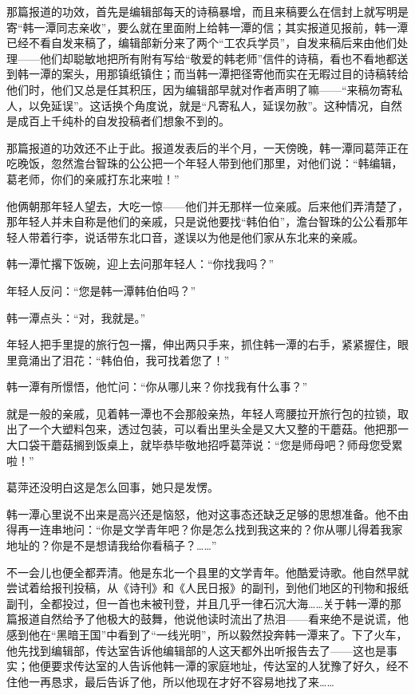 \par 那篇报道的功效，首先是编辑部每天的诗稿暴增，而且来稿要么在信封上就写明是寄“韩一潭同志亲收”，要么就在里面附上给韩一潭的信；其实报道见报前，韩一潭已经不看自发来稿了，编辑部新分来了两个“工农兵学员”，自发来稿后来由他们处理——他们却聪敏地把所有附有写给“敬爱的韩老师”信件的诗稿，看也不看地都送到韩一潭的案头，用那镇纸镇住；而当韩一潭把径寄他而实在无暇过目的诗稿转给他们时，他们又总是任其积压，因为编辑部早就对作者声明了嘛——“来稿勿寄私人，以免延误”。这话换个角度说，就是“凡寄私人，延误勿赦”。这种情况，自然是成百上千纯朴的自发投稿者们想象不到的。
\par 那篇报道的功效还不止于此。报道发表后的半个月，一天傍晚，韩一潭同葛萍正在吃晚饭，忽然澹台智珠的公公把一个年轻人带到他们那里，对他们说：“韩编辑，葛老师，你们的亲戚打东北来啦！”
\par 他俩朝那年轻人望去，大吃一惊——他们并无那样一位亲戚。后来他们弄清楚了，那年轻人并未自称是他们的亲戚，只是说他要找“韩伯伯”，澹台智珠的公公看那年轻人带着行李，说话带东北口音，遂误以为他是他们家从东北来的亲戚。
\par 韩一潭忙撂下饭碗，迎上去问那年轻人：“你找我吗？”
\par 年轻人反问：“您是韩一潭韩伯伯吗？”
\par 韩一潭点头：“对，我就是。”
\par 年轻人把手里提的旅行包一撂，伸出两只手来，抓住韩一潭的右手，紧紧握住，眼里竟涌出了泪花：“韩伯伯，我可找着您了！”
\par 韩一潭有所憬悟，他忙问：“你从哪儿来？你找我有什么事？”
\par 就是一般的亲戚，见着韩一潭也不会那般亲热，年轻人弯腰拉开旅行包的拉锁，取出了一个大塑料包来，透过包装，可以看出里头全是又大又整的干蘑菇。他把那一大口袋干蘑菇搁到饭桌上，就毕恭毕敬地招呼葛萍说：“您是师母吧？师母您受累啦！”
\par 葛萍还没明白这是怎么回事，她只是发愣。
\par 韩一潭心里说不出来是高兴还是恼怒，他对这事态还缺乏足够的思想准备。他不由得再一连串地问：“你是文学青年吧？你是怎么找到我这来的？你从哪儿得着我家地址的？你是不是想请我给你看稿子？……”
\par 不一会儿也便全都弄清。他是东北一个县里的文学青年。他酷爱诗歌。他自然早就尝试着给报刊投稿，从《诗刊》和《人民日报》的副刊，到他们地区的刊物和报纸副刊，全都投过，但一首也未被刊登，并且几乎一律石沉大海……关于韩一潭的那篇报道自然给予了他极大的鼓舞，他说他读时流出了热泪——看来绝不是说谎，他感到他在“黑暗王国”中看到了“一线光明”，所以毅然投奔韩一潭来了。下了火车，他先找到编辑部，传达室告诉他编辑部的人这天都外出听报告去了——这也是事实；他便要求传达室的人告诉他韩一潭的家庭地址，传达室的人犹豫了好久，经不住他一再恳求，最后告诉了他，所以他现在才好不容易地找了来……
